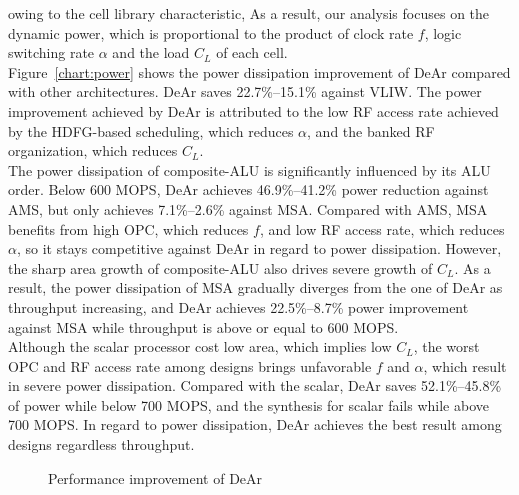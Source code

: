 owing to the cell library characteristic, 
As a result, our analysis focuses on the dynamic power, 
which is proportional to the product of clock rate $f$, logic switching rate $\alpha$ and the load $C_L$ of each cell.
\\\indent
Figure~\ref{chart:power} shows the power dissipation improvement of DeAr compared with other architectures.
DeAr saves 22.7\%--15.1\% against VLIW.
The power improvement achieved by DeAr is attributed to the low RF access rate achieved by the HDFG-based scheduling, which reduces $\alpha$, 
and the banked RF organization, which reduces $C_L$.
\\\indent
The power dissipation of composite-ALU is significantly influenced by its ALU order.
Below 600 MOPS, DeAr achieves 46.9\%--41.2\% power reduction against AMS, 
but only achieves 7.1\%--2.6\% against MSA.  
Compared with AMS, MSA benefits from high OPC, which reduces $f$, and low RF access rate, which reduces $\alpha$, 
so it stays competitive against DeAr in regard to power dissipation.
However, the sharp area growth of composite-ALU also drives severe growth of $C_L$.
As a result, the power dissipation of MSA gradually diverges from the one of DeAr as throughput increasing, 
and DeAr achieves 22.5\%--8.7\% power improvement against MSA while throughput is above or equal to 600 MOPS.
\\\indent
Although the scalar processor cost low area, which implies low $C_L$, 
the worst OPC and RF access rate among designs brings unfavorable $f$ and $\alpha$, 
which result in severe power dissipation. 
Compared with the scalar, DeAr saves 52.1\%--45.8\% of power while below 700 MOPS, 
and the synthesis for scalar fails while above 700 MOPS.
In regard to power dissipation, DeAr achieves the best result among designs regardless throughput.%
\setlength{\textfloatsep}{10pt}%
\begin{figure}
\begin{center}
%
\end{center}
\caption{Performance improvement of DeAr}
\label{chart:area}
\end{figure}
